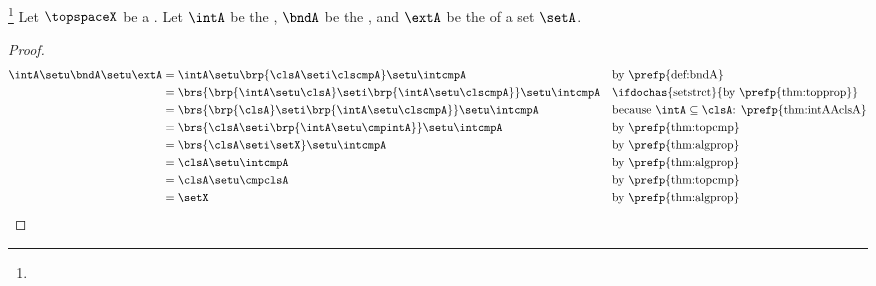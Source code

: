 \begin{proposition}
\footnote{
  }
\label{prop:intAbndAextA}
Let $\topspaceX$ be a  .
Let $\intA$ be the , $\bndA$ be the , and $\extA$ be the  of a set $\setA$.
\end{proposition}
\begin{proof}
\begin{align*}
  \intA \setu \bndA \setu \extA
    &= \intA \setu \brp{\clsA\seti\clscmpA} \setu \intcmpA
    && \text{by \prefp{def:bndA}}
  \\&= \brs{\brp{\intA \setu \clsA}\seti\brp{\intA\setu\clscmpA}} \setu \intcmpA
    && \text{\ifdochas{setstrct}{by \prefp{thm:topprop}}}
  \\&= \brs{\brp{\clsA}\seti\brp{\intA\setu\clscmpA}} \setu \intcmpA
    && \text{because $\intA\subseteq\clsA$: \prefp{thm:intAAclsA}}
  \\&= \brs{\clsA\seti\brp{\intA\setu\cmpintA}} \setu \intcmpA
    && \text{by \prefp{thm:topcmp}}
  \\&= \brs{\clsA\seti\setX} \setu \intcmpA
    && \text{by \prefp{thm:algprop}}
  \\&= \clsA \setu \intcmpA
    && \text{by \prefp{thm:algprop}}
  \\&= \clsA \setu \cmpclsA
    && \text{by \prefp{thm:topcmp}}
  \\&= \setX
    && \text{by \prefp{thm:algprop}}
\end{align*}
\end{proof}


